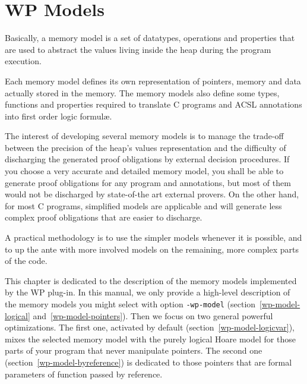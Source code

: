 \chapter{WP Models}
\label{wp-models}

Basically, a memory model is a set of datatypes, operations and
properties that are used to abstract the values living inside the heap
during the program execution.

Each memory model defines its own representation of pointers, memory
and data actually stored in the memory. The memory models also define
some types, functions and properties required to translate \textsf{C}
programs and \textsf{ACSL} annotations into first order logic
formul{\ae}.

The interest of developing several memory models is to manage the
trade-off between the precision of the heap's values representation
and the difficulty of discharging the generated proof obligations by
external decision procedures. If you choose a very accurate and
detailed memory model, you shall be able to generate proof obligations
for any program and annotations, but most of them would not be
discharged by state-of-the art external provers. On the other hand,
for most \textsf{C} programs, simplified models are applicable and
will generate less complex proof obligations that are easier to
discharge.

A practical methodology is to use the simpler models whenever it is
possible, and to up the ante with more involved models on the remaining, more
complex parts of the code.

This chapter is dedicated to the description of the memory models
implemented by the \textsf{WP} plug-in.  In this manual, we only
provide a high-level description of the memory models you might select
with option \texttt{-wp-model} (section~\ref{wp-model-logical}
and~\ref{wp-model-pointers}). Then we focus on two general powerful
optimizations. The first one, activated by default
(section~\ref{wp-model-logicvar}), mixes the selected memory model
with the purely logical Hoare model for those parts of your program
that never manipulate pointers. The second one
(section~\ref{wp-model-byreference}) is dedicated to those pointers
that are formal parameters of function passed by reference.








